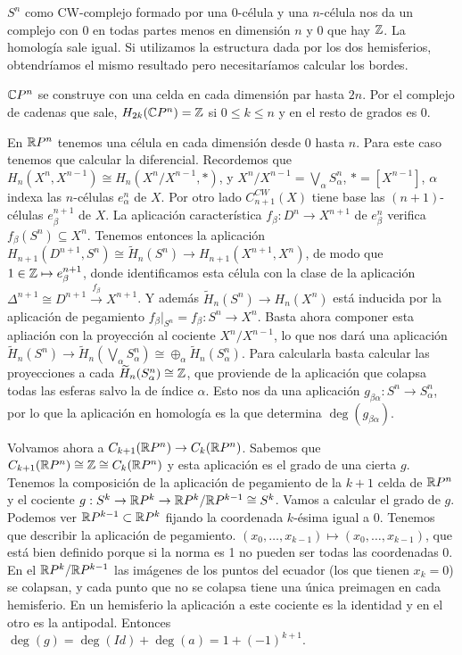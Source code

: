 \documentclass[TA.tex]{subfiles}
\begin{document}
\begin{ej}
$S^n$ como CW-complejo formado por una 0-célula y una $n$-célula nos da un complejo con 0 en todas partes menos en dimensión $n$ y $0$ que hay $\mathbb{Z}$. La homología sale igual. Si utilizamos la estructura dada por los dos hemisferios, obtendríamos el mismo resultado pero necesitaríamos calcular los bordes. 
\end{ej}

\begin{ej}
$\mathbb{C} P^n$ se construye con una celda en cada dimensión par hasta $2n$. Por el complejo de cadenas que sale, $H_{2k}(\mathbb{C} P^n)=\mathbb{Z}$ si $0\leq k\leq n$ y en el resto de grados es 0. 
\end{ej}

\begin{ej}
En $\mathbb{R} P^n$ tenemos una célula en cada dimensión desde 0 hasta $n$. Para este caso tenemos que calcular la diferencial. Recordemos que $H_n(X^n, X^{n-1})\cong H_n(X^n/X^{n-1},*)$, y $X^n/X^{n-1}=\bigvee_{\alpha} S_{\alpha}^n$, $*=[X^{n-1}]$, $\alpha$ indexa las $n$-células $e_{\alpha}^n$ de $X$. Por otro lado $C_{n+1}^{CW}(X)$ tiene base las $(n+1)$-células $e_{\beta}^{n+1}$ de $X$. La aplicación característica $f_\beta:D^n\to X^{n+1}$ de $e_{\beta}^n$ verifica $f_\beta(S^n)\subseteq X^n$. Tenemos entonces la aplicación $H_{n+1}(D^{n+1},S^n)\cong \widetilde{H}_n(S^n)\to H_{n+1}(X^{n+1},X^n)$, de modo que $1\in\mathbb{Z}\mapsto e^{n+1}_{\beta}$, donde identificamos esta célula con la clase de la aplicación $\Delta^{n+1}\cong D^{n+1}\xrightarrow{f_\beta}X^{n+1}$. Y además $\widetilde{H}_n(S^n)\to H_n(X^n)$ está inducida por la aplicación de pegamiento $f_{\beta}|_{S^n}=f_\beta:S^n\to X^n$. Basta ahora componer esta apliación con la proyección al cociente $X^n/X^{n-1}$, lo que nos dará una aplicación $\widetilde{H}_n(S^n)\to \widetilde{H}_n(\bigvee_\alpha S^n_{\alpha})\cong\oplus_\alpha\widetilde{H}_n(S^n_{\alpha})$. Para calcularla basta calcular las proyecciones a cada $\widetilde{H}_n(S^n_{\alpha})\cong\mathbb{Z}$, que proviende de la aplicación que colapsa todas las esferas salvo la de índice $\alpha$. Esto nos da una aplicación $g_{\beta\alpha}:S^n\to S^n_{\alpha}$, por lo que la aplicación en homología es la que determina $\deg(g_{\beta\alpha})$. 

Volvamos ahora a $C_{k+1}(\mathbb{R} P^n)\to C_k(\mathbb{R} P^n)$. Sabemos que $C_{k+1}(\mathbb{R} P^n)\cong\mathbb{Z}\cong C_k(\mathbb{R} P^n)$ y esta aplicación es el grado de una cierta $g$. Tenemos la composición de la aplicación de pegamiento de la $k+1$ celda de $\mathbb{R} P^n$ y el cociente $g:S^k\to \mathbb{R} P^k\to \mathbb{R} P^k/\mathbb{R} P^{k-1}\cong S^k$. Vamos a calcular el grado de $g$. Podemos ver $\mathbb{R} P^{k-1}\subset \mathbb{R} P^k$ fijando la coordenada $k$-ésima igual a 0. Tenemos que describir la aplicación de pegamiento. $(x_0,\dots, x_{k-1})\mapsto (x_0,\dots,x_{k-1})$, que está bien definido porque si la norma es 1 no pueden ser todas las coordenadas 0. En el $\mathbb{R} P^k/\mathbb{R} P^{k-1}$ las imágenes de los puntos del ecuador (los que tienen $x_k=0$) se colapsan, y cada punto que no se colapsa tiene una única preimagen en cada hemisferio. En un hemisferio la aplicación a este cociente es la identidad y en el otro es la antipodal. Entonces $\deg(g)=\deg(Id)+\deg(a)=1+(-1)^{k+1}$. 


\end{ej}
\end{document}
